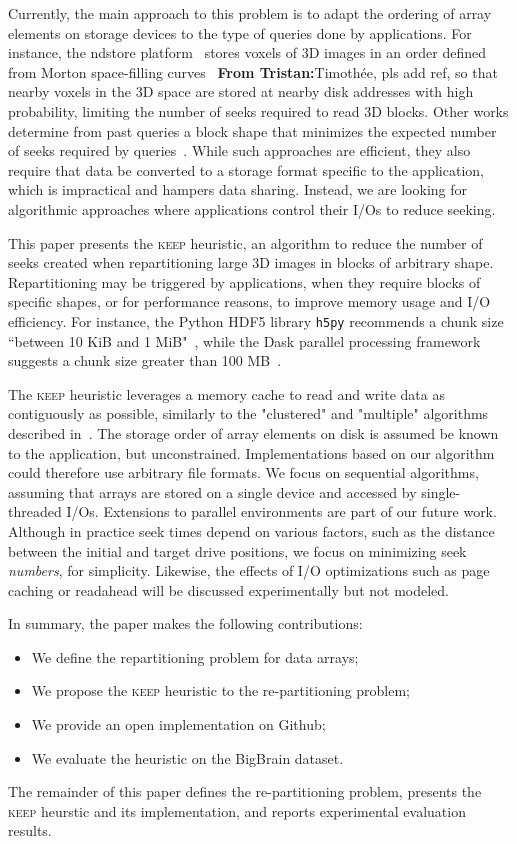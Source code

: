 \documentclass[sigconf, nonacm]{acmart}
\newcommand{\tristan}[1]{\color{orange}\textbf{From Tristan:}#1\color{black}}
\newcommand{\keep}[0]{\textsc{keep}\xspace}
\begin{document}
Currently, the main approach to this problem is to adapt the ordering of array
elements on storage devices to the type of queries done by applications.
For instance, the ndstore platform~\cite{lillaney2018building} stores voxels of 3D images
in an order defined from Morton space-filling curves~\cite{morton} \tristan{Timothée, pls add ref}, so that nearby
voxels in the 3D space are stored at nearby disk addresses with high
probability, limiting the number of seeks required to read 3D blocks. Other works determine from past queries a
block shape that minimizes the expected number of seeks required
by queries~\cite{optimal_chuking}.
While such approaches are efficient, they also require that data
be converted to a storage format specific to the application, which is
impractical and hampers data sharing. Instead, we are looking for
algorithmic approaches where applications control their I/Os to reduce seeking.

This paper presents the \keep heuristic, an algorithm to reduce the
number of seeks created when repartitioning large 3D images in blocks of
arbitrary shape. Repartitioning may be triggered by applications, when they
require blocks of specific shapes, or for performance reasons, to improve
memory usage and I/O efficiency. For instance, the Python HDF5 library
\texttt{h5py} recommends a chunk size ``between 10 KiB and 1
MiB"~\cite{collette_2014}, while the Dask parallel processing framework
~\cite{matthew_rocklin-proc-scipy-2015} suggests a chunk size greater than
100 MB~\cite{rocklin_bourbeau_2019}.

The \keep heuristic leverages a memory cache to read and write data as
contiguously as possible, similarly to the "clustered" and "multiple"
algorithms described in~\cite{seqalgorithms}. The storage order of array
elements on disk is assumed be known to the application, but unconstrained.
Implementations based on our algorithm could therefore use arbitrary file
formats. We focus on sequential algorithms, assuming that arrays are stored
on a single device and accessed by single-threaded I/Os. Extensions to parallel
environments are part of our future work. Although in practice seek times
depend on various factors, such as the distance between the initial and
target drive positions, we focus on minimizing seek \emph{numbers}, for
simplicity. Likewise, the effects of I/O optimizations such as page caching
or readahead will be discussed experimentally but not modeled.

In summary, the paper makes the following contributions:
\begin{itemize}
  \item We define the repartitioning problem for data arrays;
  \item We propose the \keep heuristic to the re-partitioning problem;
  \item We provide an open implementation on Github;
  \item We evaluate the heuristic on the BigBrain dataset.
\end{itemize}
The remainder of this paper defines the re-partitioning problem, presents the \keep heurstic and its implementation, 
and reports experimental evaluation results.
\end{document}
